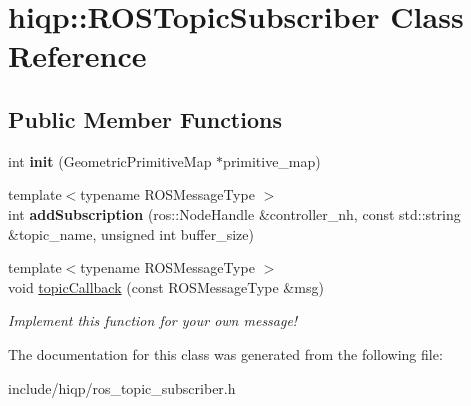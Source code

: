 \hypertarget{classhiqp_1_1ROSTopicSubscriber}{\section{hiqp\-:\-:R\-O\-S\-Topic\-Subscriber Class Reference}
\label{classhiqp_1_1ROSTopicSubscriber}
}
\subsection*{Public Member Functions}
\begin{DoxyCompactItemize}
\item 
\hypertarget{classhiqp_1_1ROSTopicSubscriber_a16243f65f126f01b3fd7663037a73f87}{int {\bfseries init} (Geometric\-Primitive\-Map $\ast$primitive\-\_\-map)}\label{classhiqp_1_1ROSTopicSubscriber_a16243f65f126f01b3fd7663037a73f87}

\item 
\hypertarget{classhiqp_1_1ROSTopicSubscriber_a49bb3142efc3c4219f873d6d40cc9ae5}{{\footnotesize template$<$typename R\-O\-S\-Message\-Type $>$ }\\int {\bfseries add\-Subscription} (ros\-::\-Node\-Handle \&controller\-\_\-nh, const std\-::string \&topic\-\_\-name, unsigned int buffer\-\_\-size)}\label{classhiqp_1_1ROSTopicSubscriber_a49bb3142efc3c4219f873d6d40cc9ae5}

\item 
\hypertarget{classhiqp_1_1ROSTopicSubscriber_addcc31d45f31fdfb386a8e1b437ef3db}{{\footnotesize template$<$typename R\-O\-S\-Message\-Type $>$ }\\void \hyperlink{classhiqp_1_1ROSTopicSubscriber_addcc31d45f31fdfb386a8e1b437ef3db}{topic\-Callback} (const R\-O\-S\-Message\-Type \&msg)}\label{classhiqp_1_1ROSTopicSubscriber_addcc31d45f31fdfb386a8e1b437ef3db}

\begin{DoxyCompactList}\small\item\em Implement this function for your own message! \end{DoxyCompactList}\end{DoxyCompactItemize}


The documentation for this class was generated from the following file\-:\begin{DoxyCompactItemize}
\item 
include/hiqp/ros\-\_\-topic\-\_\-subscriber.\-h\end{DoxyCompactItemize}
